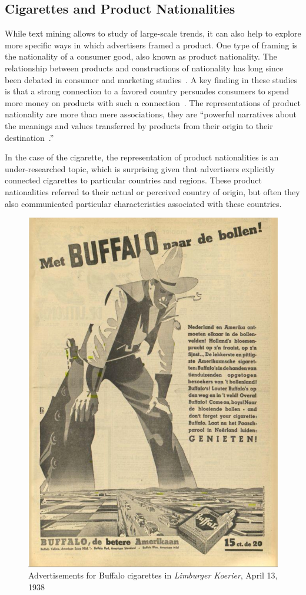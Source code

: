 \documentclass[USenglish]{article}
\begin{document}
\subsection{Cigarettes and Product Nationalities}
While text mining allows to study of large-scale trends, it can also help to explore more specific ways in which advertisers framed a product. One type of framing is the nationality of a consumer good, also known as product nationality. The relationship between products and constructions of nationality has long since been debated in consumer and marketing studies~\cite{thakor_brand_1996, hull_cultural_2016}. A key finding in these studies is that a strong connection to a favored country persuades consumers to spend more money on products with such a connection~\cite{menapace_consumers_2011}. The representations of product nationality are more than mere associations, they are ``powerful narratives about the meanings and values transferred by products from their origin to their destination~\cite{askegaard_product-country_1998}.''

In the case of the cigarette, the representation of product nationalities is an under-researched topic, which is surprising given that advertisers explicitly connected cigarettes to particular countries and regions.  These product nationalities referred to their actual or perceived country of origin, but often they also communicated particular characteristics associated with these countries. 

\begin{figure}
  \centering
  \includegraphics[width=.9\textwidth]{figures/example_buffalo.jpg}
  \caption{Advertisements for Buffalo cigarettes in \textit{Limburger Koerier}, April 13, 1938}
  \label{fig:buffalo_example}
\end{figure}
\end{document}
